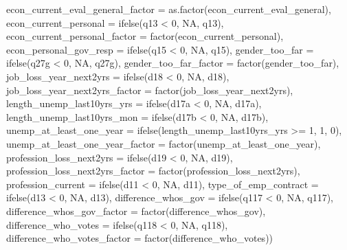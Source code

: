 \documentclass[
]{article}
\newenvironment{Shaded}{\begin{snugshade}}{\end{snugshade}}
\newcommand{\AttributeTok}[1]{\textcolor[rgb]{0.77,0.63,0.00}{#1}}
\newcommand{\ConstantTok}[1]{\textcolor[rgb]{0.00,0.00,0.00}{#1}}
\newcommand{\DecValTok}[1]{\textcolor[rgb]{0.00,0.00,0.81}{#1}}
\newcommand{\FunctionTok}[1]{\textcolor[rgb]{0.00,0.00,0.00}{#1}}
\newcommand{\NormalTok}[1]{#1}
\newcommand{\SpecialCharTok}[1]{\textcolor[rgb]{0.00,0.00,0.00}{#1}}
\begin{document}
\begin{Shaded}
\begin{Highlighting}[]
         \AttributeTok{econ\_current\_eval\_general\_factor =} \FunctionTok{as.factor}\NormalTok{(econ\_current\_eval\_general),}
         \AttributeTok{econ\_current\_personal =} \FunctionTok{ifelse}\NormalTok{(q13 }\SpecialCharTok{\textless{}} \DecValTok{0}\NormalTok{, }\ConstantTok{NA}\NormalTok{, q13), }
         \AttributeTok{econ\_current\_personal\_factor =} \FunctionTok{factor}\NormalTok{(econ\_current\_personal),}
         \AttributeTok{econ\_personal\_gov\_resp =} \FunctionTok{ifelse}\NormalTok{(q15 }\SpecialCharTok{\textless{}} \DecValTok{0}\NormalTok{, }\ConstantTok{NA}\NormalTok{, q15),}
         \AttributeTok{gender\_too\_far =} \FunctionTok{ifelse}\NormalTok{(q27g }\SpecialCharTok{\textless{}} \DecValTok{0}\NormalTok{, }\ConstantTok{NA}\NormalTok{, q27g),}
         \AttributeTok{gender\_too\_far\_factor =} \FunctionTok{factor}\NormalTok{(gender\_too\_far),}
         \AttributeTok{job\_loss\_year\_next2yrs =} \FunctionTok{ifelse}\NormalTok{(d18 }\SpecialCharTok{\textless{}} \DecValTok{0}\NormalTok{, }\ConstantTok{NA}\NormalTok{, d18),}
         \AttributeTok{job\_loss\_year\_next2yrs\_factor =} \FunctionTok{factor}\NormalTok{(job\_loss\_year\_next2yrs),}
         \AttributeTok{length\_unemp\_last10yrs\_yrs =} \FunctionTok{ifelse}\NormalTok{(d17a }\SpecialCharTok{\textless{}} \DecValTok{0}\NormalTok{, }\ConstantTok{NA}\NormalTok{, d17a),}
         \AttributeTok{length\_unemp\_last10yrs\_mon =} \FunctionTok{ifelse}\NormalTok{(d17b }\SpecialCharTok{\textless{}} \DecValTok{0}\NormalTok{, }\ConstantTok{NA}\NormalTok{, d17b),}
         \AttributeTok{unemp\_at\_least\_one\_year =} \FunctionTok{ifelse}\NormalTok{(length\_unemp\_last10yrs\_yrs }\SpecialCharTok{\textgreater{}=} \DecValTok{1}\NormalTok{, }\DecValTok{1}\NormalTok{, }\DecValTok{0}\NormalTok{),}
         \AttributeTok{unemp\_at\_least\_one\_year\_factor =} \FunctionTok{factor}\NormalTok{(unemp\_at\_least\_one\_year),}
         \AttributeTok{profession\_loss\_next2yrs =} \FunctionTok{ifelse}\NormalTok{(d19 }\SpecialCharTok{\textless{}} \DecValTok{0}\NormalTok{, }\ConstantTok{NA}\NormalTok{, d19),}
         \AttributeTok{profession\_loss\_next2yrs\_factor =} \FunctionTok{factor}\NormalTok{(profession\_loss\_next2yrs),}
         \AttributeTok{profession\_current =} \FunctionTok{ifelse}\NormalTok{(d11 }\SpecialCharTok{\textless{}} \DecValTok{0}\NormalTok{, }\ConstantTok{NA}\NormalTok{, d11),}
         \AttributeTok{type\_of\_emp\_contract =} \FunctionTok{ifelse}\NormalTok{(d13 }\SpecialCharTok{\textless{}} \DecValTok{0}\NormalTok{, }\ConstantTok{NA}\NormalTok{, d13),}
         \AttributeTok{difference\_whos\_gov =} \FunctionTok{ifelse}\NormalTok{(q117 }\SpecialCharTok{\textless{}} \DecValTok{0}\NormalTok{, }\ConstantTok{NA}\NormalTok{, q117),}
         \AttributeTok{difference\_whos\_gov\_factor =} \FunctionTok{factor}\NormalTok{(difference\_whos\_gov),}
         \AttributeTok{difference\_who\_votes =} \FunctionTok{ifelse}\NormalTok{(q118 }\SpecialCharTok{\textless{}} \DecValTok{0}\NormalTok{, }\ConstantTok{NA}\NormalTok{, q118),}
         \AttributeTok{difference\_who\_votes\_factor =} \FunctionTok{factor}\NormalTok{(difference\_who\_votes))}
\end{Highlighting}
\end{Shaded}
\end{document}

